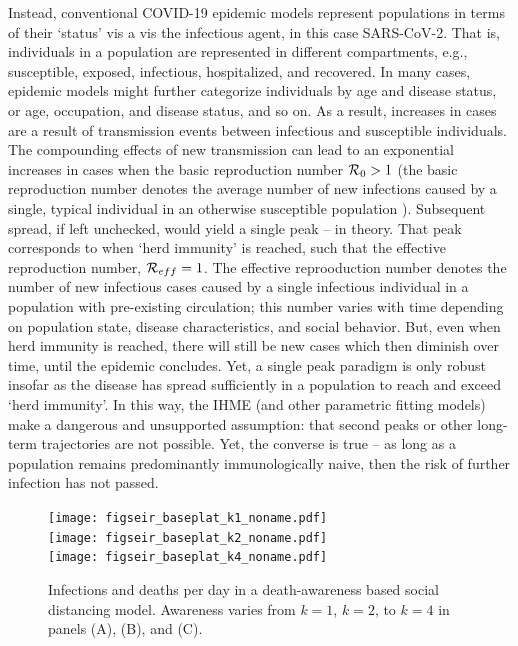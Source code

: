 Instead, conventional COVID-19 epidemic
models represent populations in terms of their `status' vis
a vis the infectious agent, in this case SARS-CoV-2.  That is, individuals
in a population are represented in different compartments, e.g.,
susceptible, exposed, infectious,
hospitalized, and recovered.  In many cases, epidemic models
might further categorize individuals by age and disease status, or age, occupation,
and disease status, and so on.  As a result, increases in cases
are a result of transmission events between infectious
and susceptible individuals.  The compounding effects 
of new transmission can lead to an exponential increases in cases 
when the basic reproduction number ${\cal{R}}_0>1$ (the
basic reproduction number denotes the average number of new
infections caused by a single, typical individual in an otherwise
susceptible population \citep{anderson1991infectious}).  Subsequent
spread, if left unchecked, would yield a single peak -- in theory. That 
peak corresponds to when `herd immunity' is reached, such
that the effective reproduction number, ${\cal{R}}_{eff}=1$.
The effective reprooduction number denotes the number of new
infectious cases caused by a single infectious individual
in a population with pre-existing circulation; this number varies with
time depending on population state, disease characteristics, and 
social behavior.
But, even when herd immunity is reached, there will still be new cases which then
diminish over time, until the epidemic concludes.  
Yet, a single peak paradigm is
only robust insofar as the disease has spread
sufficiently in a population to reach and exceed `herd immunity'.
In this way, the IHME (and other parametric fitting models) make
a dangerous and unsupported assumption: that second peaks
or other long-term trajectories are not possible.  Yet, the converse
is true -- as long as a population remains predominantly immunologically
naive, then the risk of further infection has not passed. 
\begin{figure}[t!]
\begin{center}
\texttt{[image: figseir\_baseplat\_k1\_noname.pdf]}\\
\texttt{[image: figseir\_baseplat\_k2\_noname.pdf]}\\
\texttt{[image: figseir\_baseplat\_k4\_noname.pdf]}
\caption{Infections and deaths per day in a death-awareness based
social distancing model. Awareness varies from $k=1$, $k=2$, to $k=4$ 
in panels (A), (B), and (C).
\label{fig.ID_day}}
\end{center}
\end{figure}

